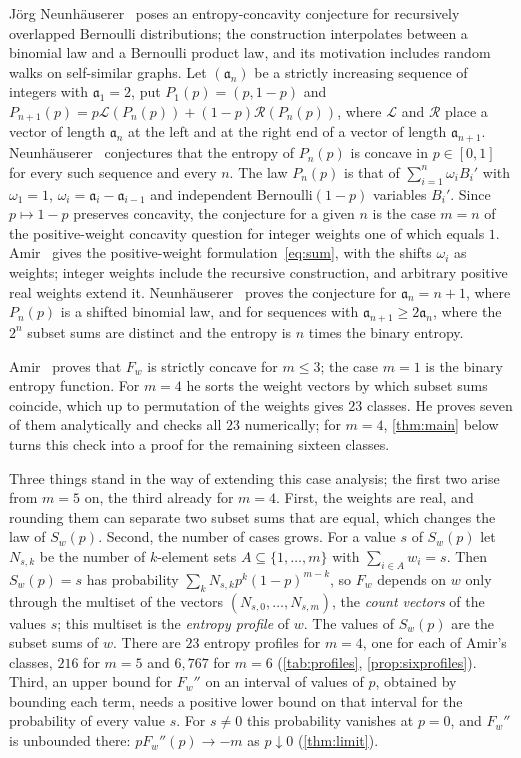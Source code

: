 \documentclass[11pt,a4paper]{article}
\numberwithin{equation}{section}
\theoremstyle{remark}
\begin{document}
J\"org Neunh\"auserer~\cite{Neun} poses an entropy-concavity conjecture for recursively overlapped Bernoulli distributions; the construction interpolates between a binomial law and a Bernoulli product law, and its motivation includes random walks on self-similar graphs. Let $(\mathfrak a_n)$ be a strictly increasing sequence of integers with $\mathfrak a_1=2$, put $P_1(p)=(p,1-p)$ and $P_{n+1}(p)=p\mathcal L(P_n(p))+(1-p)\mathcal R(P_n(p))$, where $\mathcal L$ and $\mathcal R$ place a vector of length $\mathfrak a_n$ at the left and at the right end of a vector of length $\mathfrak a_{n+1}$. Neunh\"auserer~\cite[Conjecture~3.1]{Neun} conjectures that the entropy of $P_n(p)$ is concave in $p\in[0,1]$ for every such sequence and every $n$. The law $P_n(p)$ is that of $\sum_{i=1}^n \omega_iB_i'$ with $\omega_1=1$, $\omega_i=\mathfrak a_i-\mathfrak a_{i-1}$ and independent Bernoulli$(1-p)$ variables $B_i'$. Since $p\mapsto1-p$ preserves concavity, the conjecture for a given $n$ is the case $m=n$ of the positive-weight concavity question for integer weights one of which equals $1$. Amir~\cite{Amir} gives the positive-weight formulation~\eqref{eq:sum}, with the shifts $\omega_i$ as weights; integer weights include the recursive construction, and arbitrary positive real weights extend it. Neunh\"auserer~\cite[Proposition~3.1]{Neun} proves the conjecture for $\mathfrak a_n=n+1$, where $P_n(p)$ is a shifted binomial law, and for sequences with $\mathfrak a_{n+1}\ge2\mathfrak a_n$, where the $2^n$ subset sums are distinct and the entropy is $n$ times the binary entropy.

Amir~\cite{Amir} proves that $F_w$ is strictly concave for $m\le3$; the case $m=1$ is the binary entropy function. For $m=4$ he sorts the weight vectors by which subset sums coincide, which up to permutation of the weights gives $23$ classes. He proves seven of them analytically and checks all $23$ numerically; for $m=4$, \cref{thm:main} below turns this check into a proof for the remaining sixteen classes.

Three things stand in the way of extending this case analysis; the first two arise from $m=5$ on, the third already for $m=4$. First, the weights are real, and rounding them can separate two subset sums that are equal, which changes the law of $S_w(p)$. Second, the number of cases grows. For a value $s$ of $S_w(p)$ let $N_{s,k}$ be the number of $k$-element sets $A\subseteq\{1,\ldots,m\}$ with $\sum_{i\in A}w_i=s$. Then $S_w(p)=s$ has probability $\sum_kN_{s,k}p^k(1-p)^{m-k}$, so $F_w$ depends on $w$ only through the multiset of the vectors $(N_{s,0},\ldots,N_{s,m})$, the \emph{count vectors} of the values $s$; this multiset is the \emph{entropy profile} of $w$. The values of $S_w(p)$ are the subset sums of $w$. There are $23$ entropy profiles for $m=4$, one for each of Amir's classes, $216$ for $m=5$ and $6{,}767$ for $m=6$ (\cref{tab:profiles}, \cref{prop:sixprofiles}). Third, an upper bound for $F_w''$ on an interval of values of $p$, obtained by bounding each term, needs a positive lower bound on that interval for the probability of every value $s$. For $s\ne0$ this probability vanishes at $p=0$, and $F_w''$ is unbounded there: $pF_w''(p)\to-m$ as $p\downarrow0$ (\cref{thm:limit}).
\end{document}
